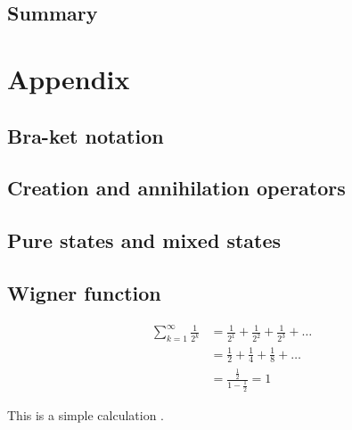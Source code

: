 \documentclass{book}
\begin{document}
\section{Summary}

\appendix
\chapter{Appendix}
\section{Bra-ket notation}
\section{Creation and annihilation operators}
\section{Pure states and mixed states}
\section{Wigner function}

\begin{equation}
\begin{aligned}
  \sum_{k=1}^\infty \frac 1 {2^k} &= \frac 1 {2^1} + \frac 1 {2^2} + \frac 1 {2^3} + \dots \\
  &= \frac{1}{2} + \frac{1}{4} + \frac{1}{8} + \dots \\
  &= \frac{\frac 1 2}{1-\frac 1 2} =  1
\end{aligned}
\end{equation}

This is a simple calculation \cite{adams1995hitchhiker}.

\printindex



\end{document}
